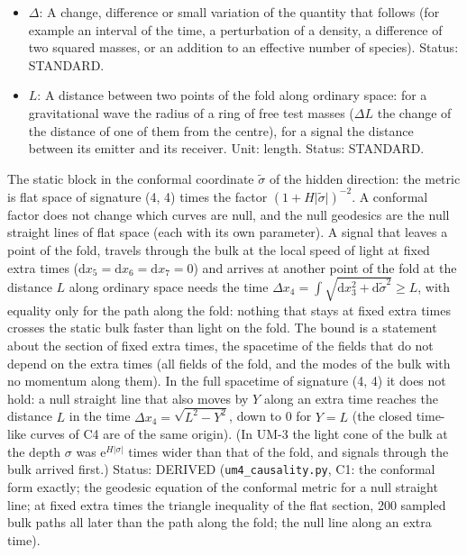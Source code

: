 \documentclass[
  10pt,
]{article}
\begin{document}
\begin{itemize}
  length. Status: AUTHOR.
\item
  \(\Delta\): A change, difference or small variation of the quantity
  that follows (for example an interval of the time, a perturbation of a
  density, a difference of two squared masses, or an addition to an
  effective number of species). Status: STANDARD.
\item
  \(L\): A distance between two points of the fold along ordinary space:
  for a gravitational wave the radius of a ring of free test masses
  (\(\Delta L\) the change of the distance of one of them from the
  centre), for a signal the distance between its emitter and its
  receiver. Unit: length. Status: STANDARD.
\end{itemize}

The static block in the conformal coordinate \(\tilde\sigma\) of the
hidden direction: the metric is flat space of signature (4, 4) times the
factor \((1 + H\lvert\tilde\sigma\rvert)^{-2}\). A conformal factor does
not change which curves are null, and the null geodesics are the null
straight lines of flat space (each with its own parameter). A signal
that leaves a point of the fold, travels through the bulk at the local
speed of light at fixed extra times
(\(\mathrm{d}x_5 = \mathrm{d}x_6 = \mathrm{d}x_7 = 0\)) and arrives at
another point of the fold at the distance \(L\) along ordinary space
needs the time
\(\Delta x_4 = \int\sqrt{\mathrm{d}x_3^2 + \mathrm{d}\tilde\sigma^2} \ge L\),
with equality only for the path along the fold: nothing that stays at
fixed extra times crosses the static bulk faster than light on the fold.
The bound is a statement about the section of fixed extra times, the
spacetime of the fields that do not depend on the extra times (all
fields of the fold, and the modes of the bulk with no momentum along
them). In the full spacetime of signature (4, 4) it does not hold: a
null straight line that also moves by \(Y\) along an extra time reaches
the distance \(L\) in the time \(\Delta x_4 = \sqrt{L^2 - Y^2}\), down
to 0 for \(Y = L\) (the closed time-like curves of C4 are of the same
origin). (In UM-3 the light cone of the bulk at the depth \(\sigma\) was
\(\mathrm{e}^{H\lvert\sigma\rvert}\) times wider than that of the fold,
and signals through the bulk arrived first.) Status: DERIVED
(\texttt{um4\_causality.py}, C1: the conformal form exactly; the
geodesic equation of the conformal metric for a null straight line; at
fixed extra times the triangle inequality of the flat section, 200
sampled bulk paths all later than the path along the fold; the null line
along an extra time).
\end{document}
